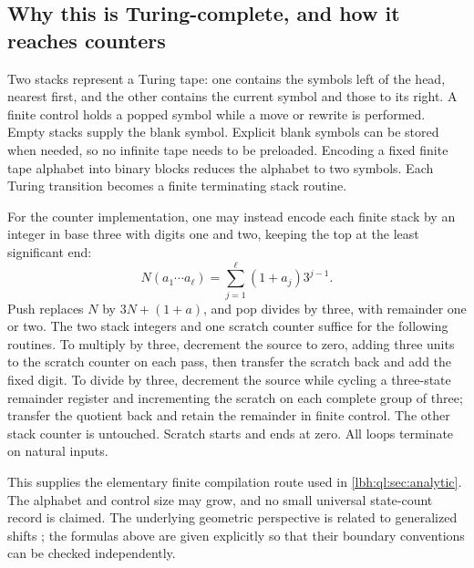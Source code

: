 \documentclass[11pt,letterpaper]{article}
\theoremstyle{definition}
\theoremstyle{remark}
\newcommand{\1}{\mathbf 1}
\begin{document}
\subsection{Why this is Turing-complete, and how it reaches counters}
Two stacks represent a Turing tape: one contains the symbols left of the
head, nearest first, and the other contains the current symbol and those to
its right. A finite control holds a popped symbol while a move or rewrite is
performed. Empty stacks supply the blank symbol. Explicit blank symbols can
be stored when needed, so no infinite tape needs to be preloaded. Encoding a
fixed finite tape alphabet into binary blocks reduces the alphabet to two
symbols. Each Turing transition becomes a finite terminating stack routine.

For the counter implementation, one may instead encode each finite stack by
an integer in base three with digits one and two, keeping the top at the least
significant end:
\[
 N(a_1\cdots a_\ell)=\sum_{j=1}^{\ell}(1+a_j)3^{j-1}.
\]
Push replaces $N$ by $3N+(1+a)$, and pop divides by three, with remainder
one or two. The two stack integers and one scratch counter suffice for the
following routines. To multiply by three, decrement the source to zero,
adding three units to the scratch counter on each pass, then transfer the
scratch back and add the fixed digit. To divide by three, decrement the source
while cycling a three-state remainder register and incrementing the scratch
on each complete group of three; transfer the quotient back and retain the
remainder in finite control. The other stack counter is untouched. Scratch
starts and ends at zero. All loops terminate on natural inputs.

This supplies the elementary finite compilation route used in
\cref{lbh:ql:sec:analytic}. The alphabet and control size may grow, and no small
universal state-count record is claimed. The underlying geometric perspective
is related to generalized shifts \cite{moore1991}; the formulas above are given
explicitly so that their boundary conventions can be checked independently.
\end{document}
